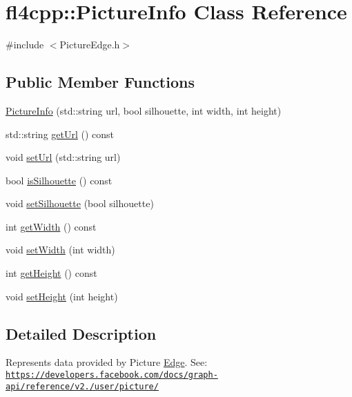 \hypertarget{classfl4cpp_1_1_picture_info}{}\section{fl4cpp\+:\+:Picture\+Info Class Reference}
\label{classfl4cpp_1_1_picture_info}


{\ttfamily \#include $<$Picture\+Edge.\+h$>$}

\subsection*{Public Member Functions}
\begin{DoxyCompactItemize}
\item 
\hyperlink{classfl4cpp_1_1_picture_info_ab46c09950b2e6394822b5a820df5ff3f}{Picture\+Info} (std\+::string url, bool silhouette, int width, int height)
\item 
std\+::string \hyperlink{classfl4cpp_1_1_picture_info_aef10512ad9cca16097d250685a2f8788}{get\+Url} () const 
\item 
void \hyperlink{classfl4cpp_1_1_picture_info_a710d5793d67bd02c1b6a035bdc67cf3e}{set\+Url} (std\+::string url)
\item 
bool \hyperlink{classfl4cpp_1_1_picture_info_a6fcdb4a9053b92fbc76415d242543e90}{is\+Silhouette} () const 
\item 
void \hyperlink{classfl4cpp_1_1_picture_info_ad8e95e648c308c09ba01c7d696733205}{set\+Silhouette} (bool silhouette)
\item 
int \hyperlink{classfl4cpp_1_1_picture_info_a9bc0050e319e5283c062656a6acc1d1b}{get\+Width} () const 
\item 
void \hyperlink{classfl4cpp_1_1_picture_info_a9ab9d52cc3e88305514238f4c4cd6825}{set\+Width} (int width)
\item 
int \hyperlink{classfl4cpp_1_1_picture_info_a6b67f70d12aff3e986b081ca4018605f}{get\+Height} () const 
\item 
void \hyperlink{classfl4cpp_1_1_picture_info_a61dd344b219388657c49fd619c9e856b}{set\+Height} (int height)
\end{DoxyCompactItemize}


\subsection{Detailed Description}
Represents data provided by Picture \hyperlink{classfl4cpp_1_1_edge}{Edge}. See\+: \href{https://developers.facebook.com/docs/graph-api/reference/v2.0/user/picture/}{\tt https\+://developers.\+facebook.\+com/docs/graph-\/api/reference/v2./user/picture/} 

